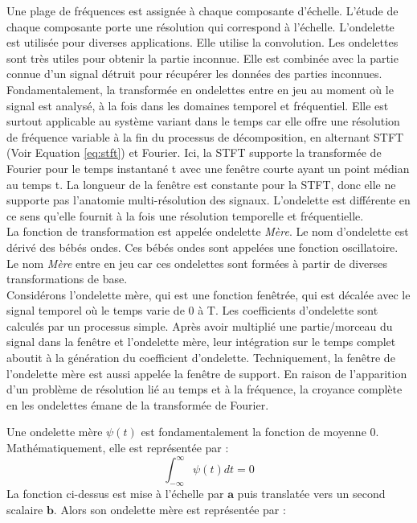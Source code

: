 Une plage de fréquences est assignée à chaque composante d'échelle. L'étude de chaque composante porte une résolution qui correspond à l'échelle. L'ondelette est utilisée pour diverses applications. Elle utilise la convolution. Les ondelettes sont très utiles pour obtenir la partie inconnue. Elle est combinée avec la partie connue d'un signal détruit pour récupérer les données des parties inconnues.\\
Fondamentalement, la transformée en ondelettes entre en jeu au moment où le signal est analysé, à la fois dans les domaines temporel et fréquentiel. Elle est surtout applicable au système variant dans le temps car elle offre une résolution de fréquence variable à la fin du processus de décomposition, en alternant STFT (Voir Equation \eqref{eq:stft}) et Fourier. Ici, la STFT supporte la transformée de Fourier pour le temps instantané t avec une fenêtre courte ayant un point médian au temps t. La longueur de la fenêtre est constante pour la STFT, donc elle ne supporte pas l'anatomie multi-résolution des signaux. L'ondelette est différente en ce sens qu'elle fournit à la fois une résolution temporelle et fréquentielle.\\
La fonction de transformation est appelée ondelette \textit{Mère}. Le nom d'ondelette est dérivé des bébés ondes. Ces bébés ondes sont appelées une fonction oscillatoire. Le nom \textit{Mère} entre en jeu car ces ondelettes sont formées à partir de diverses transformations de base.\\
Considérons l'ondelette mère, qui est une fonction fenêtrée, qui est décalée avec le signal temporel où le temps varie de 0 à T. Les coefficients d'ondelette sont calculés par un processus simple. Après avoir multiplié une partie/morceau du signal dans la fenêtre et l'ondelette mère, leur intégration sur le temps complet aboutit à la génération du coefficient d'ondelette. Techniquement, la fenêtre de l'ondelette mère est aussi appelée la fenêtre de support. En raison de l'apparition d'un problème de résolution lié au temps et à la fréquence, la croyance complète en les ondelettes émane de la transformée de Fourier.

Une ondelette mère \(\psi (t)\) est fondamentalement la fonction de moyenne 0. Mathématiquement, elle est représentée par :
\begin{equation}
    \int_{-\infty}^{\infty}\psi (t)dt = 0
    \label{eq:mean_zero_wt}
\end{equation}
La fonction ci-dessus est mise à l'échelle par $\mathbf{a}$ puis translatée vers un second scalaire $\mathbf{b}$. Alors son ondelette mère est représentée par :

